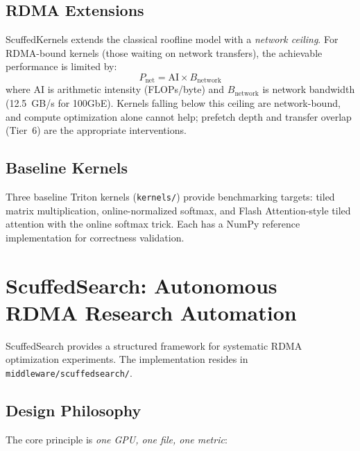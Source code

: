 \documentclass[11pt,letterpaper]{article}
\theoremstyle{definition}
\begin{document}
\subsection{RDMA Extensions}

ScuffedKernels extends the classical roofline model with a \emph{network ceiling}. For RDMA-bound kernels (those waiting on network transfers), the achievable performance is limited by:
\begin{equation}
    P_{\text{net}} = \text{AI} \times B_{\text{network}}
\end{equation}
where AI is arithmetic intensity (FLOPs/byte) and $B_{\text{network}}$ is network bandwidth (12.5~GB/s for 100GbE). Kernels falling below this ceiling are network-bound, and compute optimization alone cannot help; prefetch depth and transfer overlap (Tier~6) are the appropriate interventions.

\subsection{Baseline Kernels}

Three baseline Triton kernels (\texttt{kernels/}) provide benchmarking targets: tiled matrix multiplication, online-normalized softmax, and Flash Attention-style tiled attention with the online softmax trick. Each has a NumPy reference implementation for correctness validation.

\section{ScuffedSearch: Autonomous RDMA Research Automation}
\label{sec:scuffedsearch}

ScuffedSearch provides a structured framework for systematic RDMA optimization experiments. The implementation resides in \texttt{middleware/scuffedsearch/}.

\subsection{Design Philosophy}

The core principle is \emph{one GPU, one file, one metric}:
\end{document}
